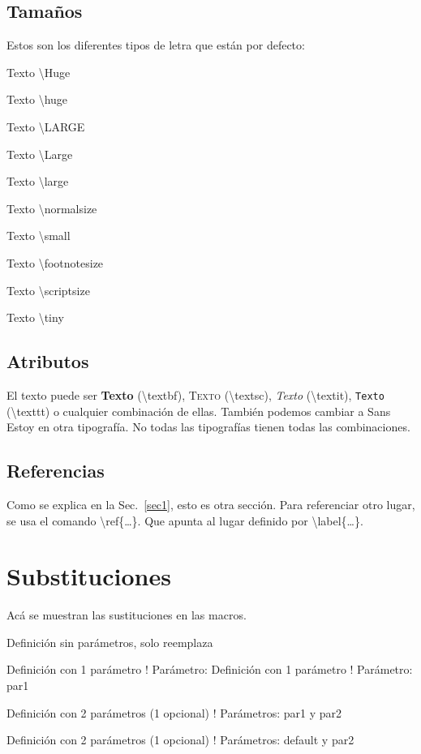 \documentclass[11pt, a4paper]{article}
\begin{document}
\subsection{Tamaños}
Estos son los diferentes tipos de letra que están por defecto:
\begin{flushleft}
	\Huge{Texto \textbackslash Huge}

	\huge{Texto \textbackslash huge}

	\LARGE{Texto \textbackslash LARGE}

	\Large{Texto \textbackslash Large}

	\large{Texto \textbackslash large}

	\normalsize{Texto \textbackslash normalsize}

	\small{Texto \textbackslash small}

	\footnotesize{Texto \textbackslash footnotesize}

	\scriptsize{Texto \textbackslash scriptsize}

	\tiny{Texto \textbackslash tiny}
\end{flushleft}

\subsection{Atributos}
El texto puede ser \textbf{Texto} (\textbackslash textbf), \textsc{Texto} (\textbackslash textsc), \textit{Texto} (\textbackslash textit), \texttt{Texto} (\textbackslash texttt) o cualquier combinación de ellas. También podemos cambiar a Sans \textsf{Estoy en otra tipografía}. No todas las tipografías tienen todas las combinaciones.

\subsection{Referencias}
Como se explica en la Sec.~\ref{sec1}, esto es otra sección. Para referenciar otro lugar, se usa el comando \textbackslash ref\{\dots\}. Que apunta al lugar definido por \textbackslash label\{\dots\}.

\newcommand{\cmdA}{Definición sin parámetros, solo reemplaza}
\newcommand{\cmdB}[1]{Definición con 1 parámetro ! Parámetro: #1}
\newcommand{\cmdC}[2][default]{Definición con 2 parámetros (1 opcional) ! Parámetros: {#1} y {#2}}

\section{Substituciones}
Acá se muestran las sustituciones en las macros.

\cmdA

\cmdB

\cmdB{par1}

\cmdC[par1]{par2}

\cmdC{par2}
\end{document}
